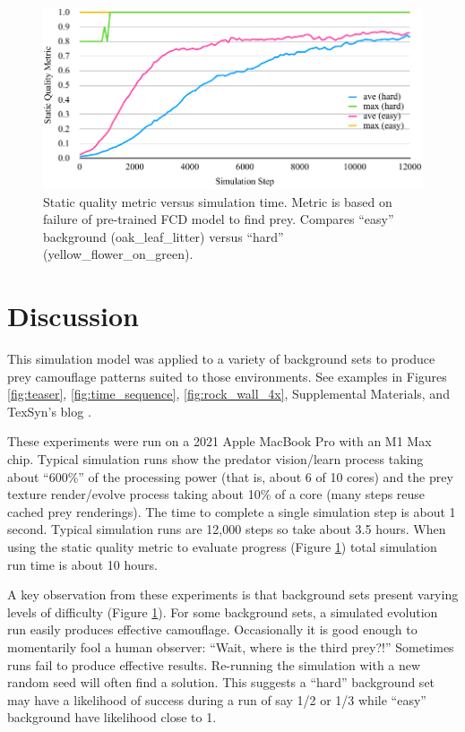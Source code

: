 \documentclass[letterpaper]{article}
\begin{document}

\begin{figure}
    \includegraphics[width=\columnwidth]{SQM_plot_easy_vs_hard.pdf}
    \caption{Static quality metric versus simulation time. Metric is based on failure of pre-trained FCD model to find prey. Compares “easy” background (oak\_leaf\_litter) versus “hard” (yellow\_flower\_on\_green).}
    \label{fig:sqm_plot}
\end{figure}


\section{Discussion}
\label{sec:discussion}
This simulation model was applied to a variety of background sets to produce prey camouflage patterns suited to those environments. See examples in Figures \ref{fig:teaser}, \ref{fig:time_sequence}, \ref{fig:rock_wall_4x}, Supplemental Materials, and TexSyn's blog \citep{reynolds_texsyn_blog_2023}.
\par
These experiments were run on a 2021 Apple MacBook Pro with an M1 Max chip. Typical simulation runs show the predator vision/learn process taking about “600\%” of the processing power (that is, about 6 of 10 cores) and the prey texture render/evolve process taking about 10\% of a core (many steps reuse cached prey renderings). The time to complete a single simulation step is about 1 second. Typical simulation runs are 12,000 steps so take about 3.5 hours. When using the static quality metric to evaluate progress (Figure \ref{fig:sqm_plot}) total simulation run time is about 10 hours.
\par
A key observation from these experiments is that background sets present varying levels of difficulty (Figure \ref{fig:sqm_plot}). For some background sets, a simulated evolution run easily produces effective camouflage. Occasionally it is good enough to momentarily fool a human observer: “Wait, where is the third prey?!” Sometimes runs fail to produce effective results. Re-running the simulation with a new random seed will often find a solution. This suggests a “hard” background set may have a likelihood of success during a run of say 1/2 or 1/3 while “easy” background have likelihood close to 1.
\par
\end{document}
